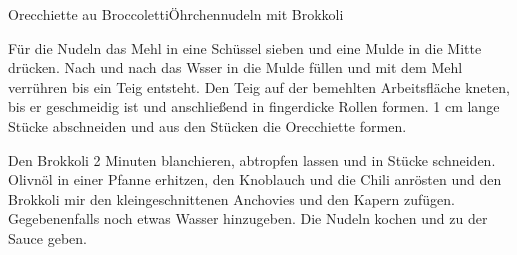 \begin{recipe}{Orecchiette au Broccoletti}{Öhrchennudeln mit Brokkoli}
  \label{Orecchiette au Broccoletti}


  \steps
  Für die Nudeln das Mehl in eine Schüssel sieben und eine Mulde in die Mitte drücken.
  Nach und nach das Wsser in die Mulde füllen und mit dem Mehl verrühren bis ein Teig
  entsteht. Den Teig auf der bemehlten Arbeitsfläche kneten, bis er geschmeidig ist und
  anschließend in fingerdicke Rollen formen. 1 cm lange Stücke abschneiden und aus den
  Stücken die Orecchiette formen.

  Den Brokkoli 2 Minuten blanchieren, abtropfen lassen und in Stücke schneiden. Olivnöl in
  einer Pfanne erhitzen, den Knoblauch und die Chili anrösten und den Brokkoli mir den
  kleingeschnittenen Anchovies und den Kapern zufügen. Gegebenenfalls noch etwas Wasser
  hinzugeben. Die Nudeln kochen und zu der Sauce geben.
\end{recipe}
